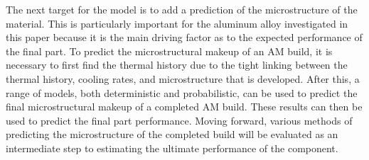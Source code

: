 The next target for the model is to add a prediction of the microstructure of the material.  This is particularly important for the aluminum alloy investigated in this paper because it is the main driving factor as to the expected performance of the final part\cite{guoMicrostructureMechanicalProperties2022}.
To predict the microstructural makeup of an \ac{AM} build, it is necessary to first find the thermal history due to the tight linking between the thermal history, cooling rates, and microstructure that is developed.  After this, a range of models, both deterministic and probabilistic, can be used to predict the final microstructural makeup of a completed \ac{AM} build\cite{tanMicrostructureModellingMetallic2020}.  These results can then be used to predict the final part performance.  Moving forward, various methods of predicting the microstructure of the completed build will be evaluated as an intermediate step to estimating the ultimate performance of the component.


